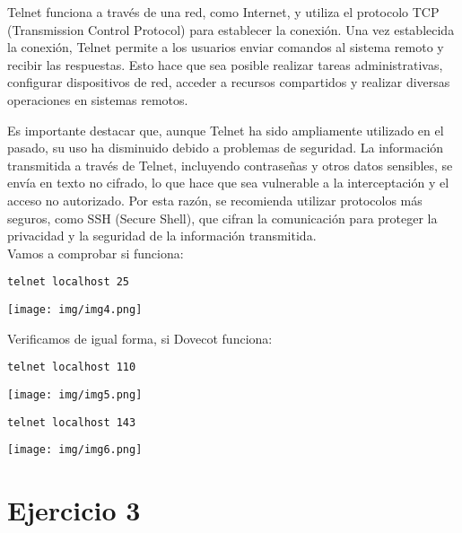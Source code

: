 \documentclass{article}
\begin{document}
Telnet funciona a través de una red, como Internet, y utiliza el protocolo TCP (Transmission Control Protocol) para establecer la conexión. Una vez establecida la conexión, Telnet permite a los usuarios enviar comandos al sistema remoto y recibir las respuestas. Esto hace que sea posible realizar tareas administrativas, configurar dispositivos de red, acceder a recursos compartidos y realizar diversas operaciones en sistemas remotos.

Es importante destacar que, aunque Telnet ha sido ampliamente utilizado en el pasado, su uso ha disminuido debido a problemas de seguridad. La información transmitida a través de Telnet, incluyendo contraseñas y otros datos sensibles, se envía en texto no cifrado, lo que hace que sea vulnerable a la interceptación y el acceso no autorizado. Por esta razón, se recomienda utilizar protocolos más seguros, como SSH (Secure Shell), que cifran la comunicación para proteger la privacidad y la seguridad de la información transmitida.
\\

Vamos a comprobar si funciona:

\lstset{language=Bash, breaklines=true, basicstyle=\footnotesize}
\begin{lstlisting}[frame=single]
telnet localhost 25
\end{lstlisting}

\begin{center}
\texttt{[image: img/img4.png]} 
\end{center}
 

Verificamos de igual forma, si Dovecot funciona:
\lstset{language=Bash, breaklines=true, basicstyle=\footnotesize}
\begin{lstlisting}[frame=single]
telnet localhost 110
\end{lstlisting}

\begin{center}
\texttt{[image: img/img5.png]} 
\end{center}
\lstset{language=Bash, breaklines=true, basicstyle=\footnotesize}
\begin{lstlisting}[frame=single]
telnet localhost 143
\end{lstlisting}
\begin{center}
\texttt{[image: img/img6.png]} 
\end{center}


\section{Ejercicio 3}
\end{document}
